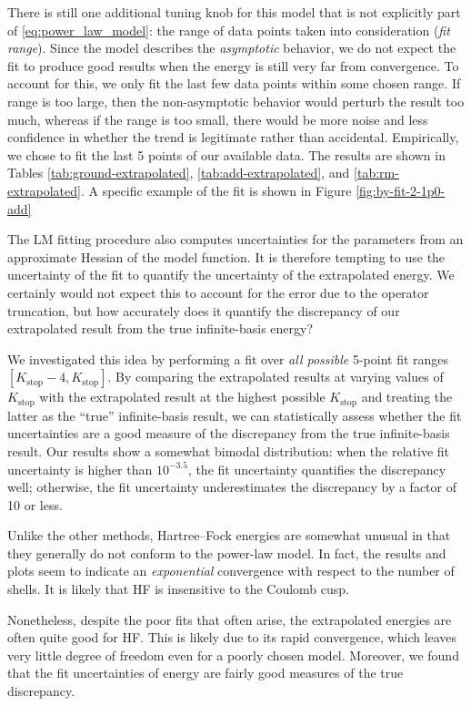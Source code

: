 There is still one additional tuning knob for this model that is not explicitly part of \eqref{eq:power_law_model}: the range of data points taken into consideration (\textit{fit range}).  Since the model describes the \emph{asymptotic} behavior, we do not expect the fit to produce good results when the energy is still very far from convergence.  To account for this, we only fit the last few data points within some chosen range.  If range is too large, then the non-asymptotic behavior would perturb the result too much, whereas if the range is too small, there would be more noise and less confidence in whether the trend is legitimate rather than accidental.  Empirically, we chose to fit the last 5 points of our available data.  The results are shown in Tables \ref{tab:ground-extrapolated}, \ref{tab:add-extrapolated}, and \ref{tab:rm-extrapolated}.  A specific example of the fit is shown in Figure \ref{fig:by-fit-2-1p0-add}

The LM fitting procedure also computes uncertainties for the parameters from an approximate Hessian of the model function.  It is therefore tempting to use the uncertainty of the fit to quantify the uncertainty of the extrapolated energy.  We certainly would not expect this to account for the error due to the operator truncation, but how accurately does it quantify the discrepancy of our extrapolated result from the true infinite-basis energy?

We investigated this idea by performing a fit over \emph{all possible} 5-point fit ranges $[K_{\text{stop}} - 4, K_{\text{stop}}]$.  By comparing the extrapolated results at varying values of $K_{\text{stop}}$ with the extrapolated result at the highest possible $K_{\text{stop}}$ and treating the latter as the ``true'' infinite-basis result, we can statistically assess whether the fit uncertainties are a good measure of the discrepancy from the true infinite-basis result.  Our results show a somewhat bimodal distribution: when the relative fit uncertainty is higher than $10^{-3.5}$, the fit uncertainty quantifies the discrepancy well; otherwise, the fit uncertainty underestimates the discrepancy by a factor of 10 or less.

Unlike the other methods, Hartree--Fock energies are somewhat unusual in that they generally do not conform to the power-law model.  In fact, the results and plots seem to indicate an \emph{exponential} convergence with respect to the number of shells.  It is likely that HF is insensitive to the Coulomb cusp.

Nonetheless, despite the poor fits that often arise, the extrapolated energies are often quite good for HF.  This is likely due to its rapid convergence, which leaves very little degree of freedom even for a poorly chosen model.  Moreover, we found that the fit uncertainties of energy are fairly good measures of the true discrepancy.

